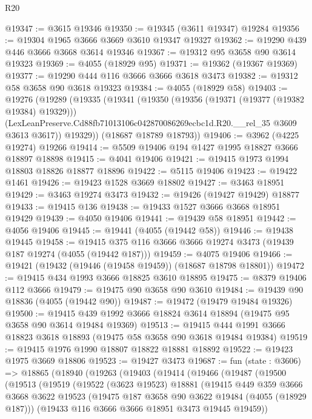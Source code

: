 \begin{lexlean}{R20}
\begin{coremodule}
@19347 := @3615 @19346
@19350 := @19345 (@3611 @19347) @19284
@19356 := @19304 @1965 @3666 @3669 @3610 @19347 @19327
@19362 := @19290 @439 @446 @3666 @3668 @3614 @19346
@19367 := @19312 @95 @3658 @90 @3614 @19323
@19369 := @4055 (@18929 @95)
@19371 := @19362 (@19367 @19369)
@19377 := @19290 @444 @116 @3666 @3666 @3618 @3473
@19382 := @19312 @58 @3658 @90 @3618 @19323
@19384 := @4055 (@18929 @58)
@19403 := @19276
    (@19289
      (@19335
        (@19341
          (@19350
            (@19356 (@19371 (@19377 (@19382 @19384) @19329)))
            (LexLeanPreserve.Cd88fb71013106c042870086269ecbc1d.R20.__rel_35 @3609 @3613 @3617))
          @19329))
      (@18687 @18789 @18793))
@19406 := @3962 (@4225 @19274) @19266
@19414 := @5509 @19406 @194 @1427 @1995 @18827 @3666 @18897 @18898
@19415 := @4041 @19406
@19421 := @19415 @1973 @1994 @18803 @18826 @18877 @18896
@19422 := @5115 @19406
@19423 := @19422 @1461
@19426 := @19423 @1528 @3669 @18802
@19427 := @3463 @18951
@19429 := @3463 @19274 @3473
@19432 := @19426 (@19427 @19429) @18877
@19433 := @19415 @136
@19438 := @19433 @1527 @3666 @3668 @18951 @19429
@19439 := @4050 @19406
@19441 := @19439 @58 @18951
@19442 := @4056 @19406
@19445 := @19441 (@4055 (@19442 @58))
@19446 := @19438 @19445
@19458 := @19415 @375 @116 @3666 @3666 @19274 @3473 (@19439 @187 @19274 (@4055 (@19442 @187)))
@19459 := @4075 @19406
@19466 := @19421 (@19432 (@19446 (@19458 @19459)) (@18687 @18798 @18801))
@19472 := @19415 @434 @1993 @3666 @18825 @3610 @18895
@19475 := @8379 @19406 @112 @3666
@19479 := @19475 @90 @3658 @90 @3610
@19484 := @19439 @90 @18836 (@4055 (@19442 @90))
@19487 := @19472 (@19479 @19484 @19326)
@19500 := @19415 @439 @1992 @3666 @18824 @3614 @18894 (@19475 @95 @3658 @90 @3614 @19484 @19369)
@19513 := @19415 @444 @1991 @3666 @18823 @3618 @18893 (@19475 @58 @3658 @90 @3618 @19484 @19384)
@19519 := @19415 @1976 @1990 @18807 @18822 @18881 @18892
@19522 := @19423 @1975 @3669 @18806
@19523 := @19427 @3473
@19687 := fun (state : @3606) =>
  @18865
    (@18940
      (@19263
        (@19403
          (@19414
            (@19466
              (@19487
                (@19500
                  (@19513
                    (@19519
                      (@19522
                        (@3623 @19523)
                        @18881
                        (@19415
                          @449
                          @359
                          @3666
                          @3668
                          @3622
                          @19523
                          (@19475 @187 @3658 @90 @3622 @19484 (@4055 (@18929 @187)))
                          (@19433 @116 @3666 @3666 @18951 @3473 @19445 @19459))

\end{coremodule}
\end{lexlean}
